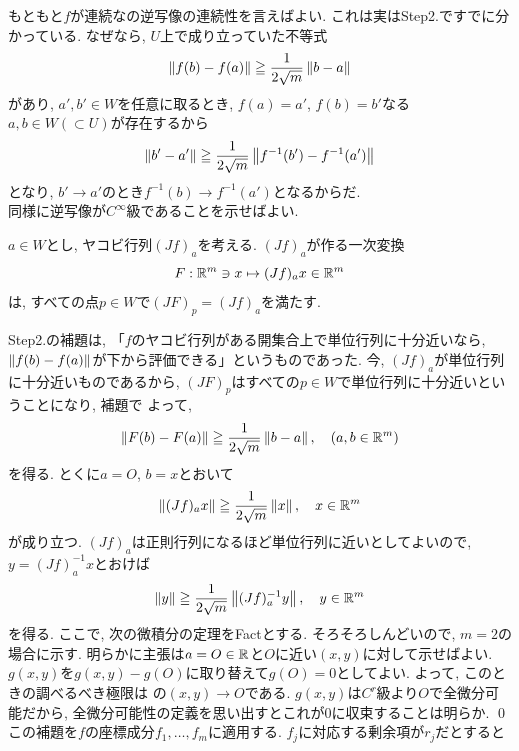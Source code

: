 もともと$f$が連続なの逆写像の連続性を言えばよい. これは実はStep2.ですでに分かっている. なぜなら, $U$上で成り立っていた不等式
\[\left\| f(b) - f(a) \right\| \geqq \dfrac{1}{2\sqrt{m}}\left\| b - a \right\| \]
があり, $a',b'\in W$を任意に取るとき, $f(a) = a'$, $f(b) = b'$なる$a,b\in W(\subset U)$が存在するから
\[\left\| b' - a' \right\| \geqq \dfrac{1}{2\sqrt{m}}\left\| f^{-1}(b') - f^{-1}(a') \right\|\]
となり, $b' \to a'$のとき$f^{-1}(b) \to f^{-1}(a')$となるからだ. \\
同様に逆写像が$C^{\infty}$級であることを示せばよい.\par
$a\in W$とし, ヤコビ行列$(Jf)_{a}$を考える. $(Jf)_{a}$が作る一次変換
\[F: \mathbb{R}^m \ni x\mapsto (Jf)_{a} x \in \mathbb{R}^m\]
は, すべての点$p\in W$で$(JF)_{p} = (Jf)_{a}$を満たす. \par
Step2.の補題は, 「$f$のヤコビ行列がある開集合上で単位行列に十分近いなら, $\left\| f(b) - f(a) \right\|$が下から評価できる」というものであった. 今, $(Jf)_{a}$が単位行列に十分近いものであるから, $(JF)_{p}$はすべての$p\in W$で単位行列に十分近いということになり, 補題で よって,
\[\left\| F(b) - F(a) \right\|\geqq \dfrac{1}{2\sqrt{m}} \left\| b - a \right\|,\quad (a,b\in \mathbb{R}^m)\]
を得る. とくに$a=O$, $b=x$とおいて
\[\left\| (Jf)_{a} x \right\|\geqq \dfrac{1}{2\sqrt{m}} \left\| x \right\|,\quad x\in \mathbb{R}^m\]
が成り立つ. $(Jf)_{a}$は正則行列になるほど単位行列に近いとしてよいので, $y=(Jf)_{a}^{-1}x$とおけば
\[\left\| y \right\| \geqq \dfrac{1}{2\sqrt{m}} \left\| (Jf)_{a}^{-1}y \right\|,\quad y\in \mathbb{R}^m\]
を得る. ここで, 次の微積分の定理をFactとする.
\prf そろそろしんどいので, $m=2$の場合に示す. 明らかに主張は$a=O\in \mathbb{R}$と$O$に近い$(x,y)$に対して示せばよい. $g(x,y)$を$g(x,y) - g(O)$に取り替えて$g(O) = 0$としてよい. よって, このときの調べるべき極限は
の$(x,y)\to O$である. $g(x,y)$は$C^r$級より$O$で全微分可能だから, 全微分可能性の定義を思い出すとこれが0に収束することは明らか. \qed \\
この補題を$f$の座標成分$f_1,\dots,f_m$に適用する. $f_j$に対応する剰余項が$r_j$だとすると
